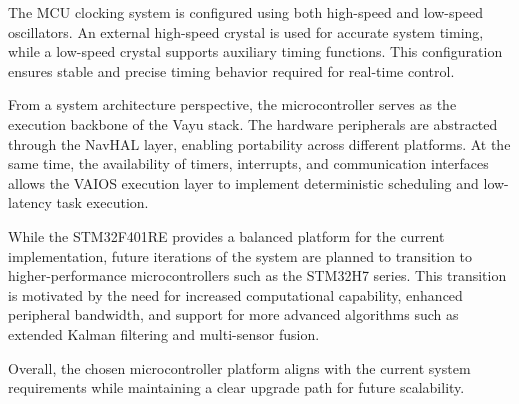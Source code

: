 The MCU clocking system is configured using both high-speed and low-speed oscillators. An external high-speed crystal is used for accurate system timing, while a low-speed crystal supports auxiliary timing functions. This configuration ensures stable and precise timing behavior required for real-time control.

From a system architecture perspective, the microcontroller serves as the execution backbone of the Vayu stack. The hardware peripherals are abstracted through the NavHAL layer, enabling portability across different platforms. At the same time, the availability of timers, interrupts, and communication interfaces allows the VAIOS execution layer to implement deterministic scheduling and low-latency task execution.

While the STM32F401RE provides a balanced platform for the current implementation, future iterations of the system are planned to transition to higher-performance microcontrollers such as the STM32H7 series. This transition is motivated by the need for increased computational capability, enhanced peripheral bandwidth, and support for more advanced algorithms such as extended Kalman filtering and multi-sensor fusion.

Overall, the chosen microcontroller platform aligns with the current system requirements while maintaining a clear upgrade path for future scalability.